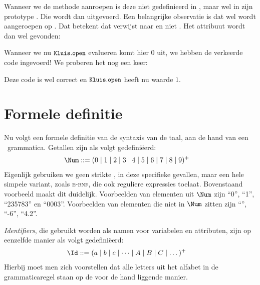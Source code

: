 Wanneer we de methode  aanroepen is deze niet gedefinieerd in , maar wel in zijn prototype . Die wordt dan uitgevoerd. Een belangrijke observatie is dat  wel wordt aangeroepen op . Dat betekent dat  verwijst naar  en niet . Het attribuut  wordt dan wel gevonden:

\begin{codelines}
\end{codelines}

Wanneer we nu $\text{\ttfamily\small\upshape Kluis}.\text{\ttfamily\small\upshape open}$ evalueren komt hier $0$ uit, we hebben de verkeerde code ingevoerd! We proberen het nog een keer:

\begin{codelines}
\end{codelines}

Deze code is wel correct en $\text{\ttfamily\small\upshape Kluis}.\text{\ttfamily\small\upshape open}$ heeft nu waarde $1$.

\section{Formele definitie}
\label{sec:formeletaal}

Nu volgt een formele definitie van de syntaxis van de taal, aan de hand van een \BNF\ grammatica. Getallen zijn als volgt gedefiniëerd:
%
\begin{align*}
  \Num \GrammarDef (0 \mid 1 \mid 2 \mid 3 \mid 4 \mid 5 \mid 6 \mid 7 \mid 8 \mid 9)^+
\end{align*}
%
Eigenlijk gebruiken we geen strikte \BNF, in deze specifieke gevallen, maar een hele simpele variant, zoals \textsc{e-bnf}, die ook reguliere expressies toelaat. Bovenstaand voorbeeld maakt dit duidelijk. Voorbeelden van elementen uit $\Num$ zijn “0”, “1”, “235783” en “0003”. Voorbeelden van elementen die niet in $\Num$ zitten zijn “”, “-6”, “4.2”.

\emph{Identifiers}, die gebruikt worden als namen voor variabelen en attributen, zijn op eenzelfde manier als volgt gedefiniëerd:
%
\begin{align*}
  \Id \GrammarDef (a \mid b \mid c \mid \dots \mid A \mid B \mid C \mid \dots)^+
\end{align*}
%
Hierbij moet men zich voorstellen dat alle letters uit het alfabet in de grammaticaregel staan op de voor de hand liggende manier.

